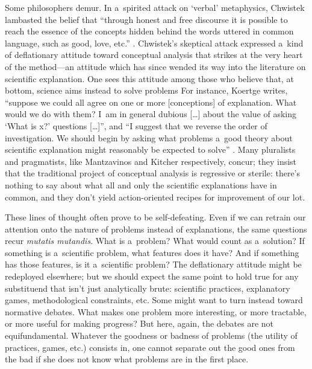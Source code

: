 Some philosophers demur. In a~spirited attack on ‘verbal' metaphysics, Chwistek
\parencite*[][]{chwistek_tragedia_1932} %
 lambasted the belief that ``through honest and free discourse it is possible to reach the essence of the concepts hidden behind the words uttered in common language, such as good, love, etc.'' 
\parencite[][p.2]{trybus_tragedy_2017}. %
 Chwistek's skeptical attack expressed a~kind of deflationary attitude toward conceptual analysis that strikes at the very heart of the method---an attitude which has since wended its way into the literature on scientific explanation. One sees this attitude among those who believe that, at bottom, science aims instead to solve problems 
 For instance, Koertge writes, ``suppose we could all agree on one or more [conceptions] of explanation. What would we do with them? I~am in general dubious […] about the value of asking ‘What is x?' questions […]'', and ``I suggest that we reverse the order of investigation. We should begin by asking what problems a~good theory about scientific explanation might reasonably be expected to solve'' 
\parencite[][pp.85–86]{koertge_explanation_1992}. %
 Many pluralists and pragmatists, like Mantzavinos 
\parencite*[][p.14]{mantzavinos_explanatory_2016} %
 and Kitcher 
\parencite*[][p.60]{kitcher_whats_2023} %
 respectively, concur; they insist that the traditional project of conceptual analysis is regressive or sterile: there's nothing to say about what all and only the scientific explanations have in common, and they don't yield action-oriented recipes for improvement of our lot.

These lines of thought often prove to be self-defeating. Even if we can retrain our attention onto the nature of problems instead of explanations, the same questions recur \textit{mutatis mutandis}. What is a~problem? What would count as a~solution? If something is a~scientific problem, what features does it have? And if something has those features, is it a~scientific problem? The deflationary attitude might be redeployed elsewhere; but we should expect the same point to hold true for any substituend that isn't just analytically brute: scientific practices, explanatory games, methodological constraints, etc. Some might want to turn instead toward normative debates. What makes one problem more interesting, or more tractable, or more useful for making progress? But here, again, the debates are not equifundamental. Whatever the goodness or badness of problems (the utility of practices, games, etc.) consists in, one cannot separate out the good ones from the bad if she does not know what problems are in the first place.


